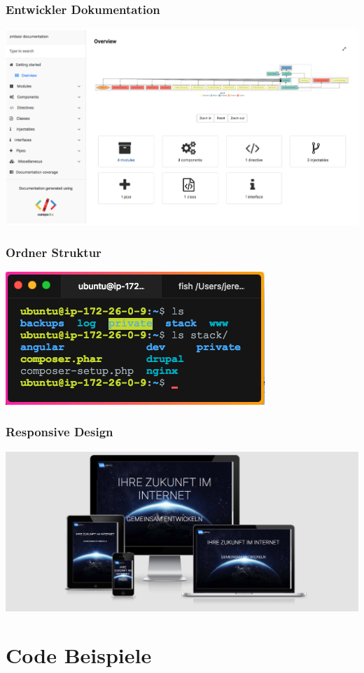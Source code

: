 \documentclass[11pt,a4paper]{article}
\begin{document}
\begin{appendices}
\subsubsection{Entwickler Dokumentation}
\label{sec:doku}
\includegraphics[scale=0.3]{compodoc}
\subsubsection{Ordner Struktur}
\label{sec:ordner}
\includegraphics[scale=0.8]{terminal}
\subsubsection{Responsive Design}
\label{sec:responsive}
\includegraphics[scale=0.3]{responsive}
\section{Code Beispiele}

\end{appendices}
\end{document}
